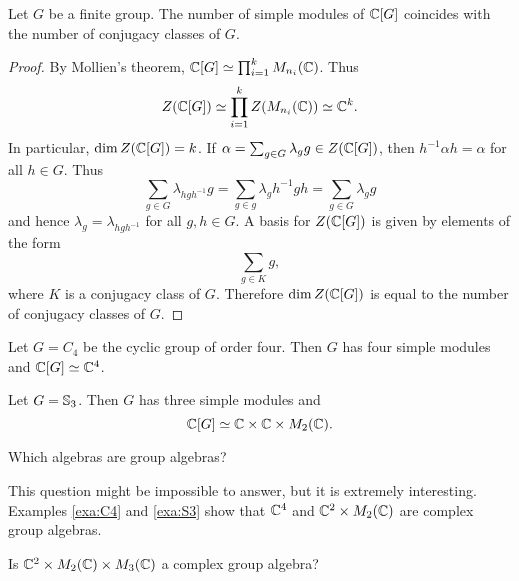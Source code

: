 \begin{theorem}
    Let $G$ be a finite group. The number of simple 
    modules of $\mathbb{C}[G]$ coincides with the number of conjugacy classes of $G$. 
\end{theorem}

\begin{proof}
    By Mollien's theorem, $\mathbb{C}[G]\simeq\prod_{i=1}^kM_{n_i}(\mathbb{C})$. Thus 
    \[
		Z(\mathbb{C}[G])\simeq\prod_{i=1}^kZ(M_{n_i}(\mathbb{C}))\simeq\mathbb{C}^k.
	\]
	In particular, $\dim Z(\mathbb{C}[G])=k$. If $\alpha=\sum_{g\in
	G}\lambda_gg\in Z(\mathbb{C}[G])$, then $h^{-1}\alpha h=\alpha$ for all $h\in
	G$. Thus 
	\[
		\sum_{g\in G}\lambda_{hgh^{-1}}g=
		\sum_{g\in g}\lambda_g h^{-1}gh=\sum_{g\in G}\lambda_gg
	\]
	and hence $\lambda_{g}=\lambda_{hgh^{-1}}$ for all $g,h\in G$. A basis for 
	$Z(\mathbb{C}[G])$ is given by elements of the form 
	\[
		\sum_{g\in K}g,
	\]
	where $K$ is a conjugacy class of $G$. Therefore $\dim Z(\mathbb{C}[G])$ is equal to 
	the number of conjugacy classes of $G$.
\end{proof}

\begin{example}
\label{exa:C4}
    Let $G=C_4$ be the cyclic group of order four. Then
    $G$ has four simple modules and 
    $\mathbb{C}[G]\simeq\mathbb{C}^4$. 
\end{example}

\begin{example}
\label{exa:S3}
    Let $G=\mathbb{S}_3$. Then $G$ has three simple modules and
    \[
    \mathbb{C}[G]\simeq\mathbb{C}\times\mathbb{C}\times M_2(\mathbb{C}).
    \]
\end{example}

\begin{problem}[Brauer]
    Which algebras are group algebras? 
\end{problem}

This question might be impossible to answer, but it is extremely interesting. 
Examples \ref{exa:C4} and \ref{exa:S3} show
that $\mathbb{C}^4$ and $\mathbb{C}^2\times M_2(\mathbb{C})$ are complex group algebras. 

\begin{exercise}
    Is $\mathbb{C}^2\times M_2(\mathbb{C})\times M_3(\mathbb{C})$ a complex group algebra?  
\end{exercise}

